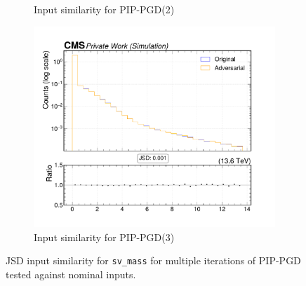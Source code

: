 \begin{figure}[htbp]
\begin{subfigure}[t]{0.32\textwidth}
    \caption*{Input similarity for PIP-PGD(2)}
  \end{subfigure}\hfill
  \begin{subfigure}[t]{0.32\textwidth}
    \includegraphics[width=\linewidth]{media/output/features/compare/combined_it_3/cmp_vtx_arr_sv_mass.pdf}
    \caption*{Input similarity for PIP-PGD(3)}
  \end{subfigure}

  \caption*{JSD input similarity for \texttt{sv\_mass} for multiple iterations of PIP-PGD tested against nominal inputs.}
  \label{fig:combined_input_sv_mass}
\end{figure}

